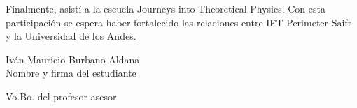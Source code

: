 \documentclass{article}
\begin{document}
Finalmente, asistí a la escuela Journeys into Theoretical Physics. Con esta participación se espera haber fortalecido las relaciones entre IFT-Perimeter-Saifr y la Universidad de los Andes.

\vspace{1.5cm}
Iván Mauricio Burbano Aldana\\

Nombre y firma del estudiante

\vspace{1.5cm}
Vo.Bo. del profesor asesor



\end{document}

